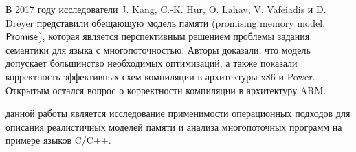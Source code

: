 В 2017 году исследователи J. Kang, C.-K. Hur, O. Lahav, V. Vafeiadis и D. Dreyer
представили обещающую модель памяти (promising memory model, $\mathsf{Promise}$), которая является перспективным
решением проблемы задания семантики для языка с многопоточностью. Авторы 
доказали, что модель допускает большинство необходимых оптимизаций, а также показали корректность
эффективных схем компиляции в архитектуры x86 и Power. Открытым остался вопрос о корректности компиляции
в архитектуру ARM.





{\aim} данной работы является исследование применимости операционных
подходов для описания реалистичных моделей памяти и анализа
многопоточных программ на примере языков C/C++.

